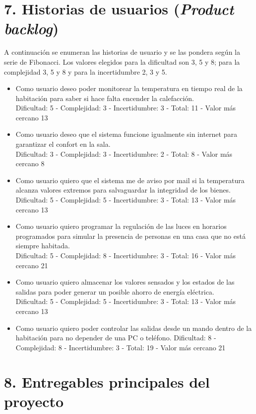 \documentclass[
11pt, %
]{charter}
\begin{document}
\section{7. Historias de usuarios (\textit{Product backlog})}
\label{sec:backlog}

A continuación se enumeran las historias de usuario y se las pondera según la serie de Fibonacci. Los valores elegidos para la dificultad son 3, 5 y 8; para la complejidad 3, 5 y 8 y para la incertidumbre 2, 3 y 5.
\begin{itemize}
	\item Como usuario deseo poder monitorear la temperatura en tiempo real de la habitación para saber si hace falta encender la calefacción. \\
Dificultad: 5 - Complejidad: 3 - Incertidumbre: 3	 - Total: 11 - Valor más cercano 13
	\item Como usuario deseo que el sistema funcione igualmente sin internet para garantizar el confort en la sala. \\
Dificultad: 3 - Complejidad: 3 - Incertidumbre: 2	 - Total: 8 - Valor más cercano 8	
	\item Como usuario quiero que el sistema me de aviso por mail si la temperatura alcanza valores extremos para salvaguardar la integridad de los bienes. \\
Dificultad: 5 - Complejidad: 5 - Incertidumbre: 3	 - Total: 13 - Valor más cercano 13
	\item Como usuario quiero programar la regulación de las luces en horarios programados para simular la presencia de personas en una casa que no está siempre habitada. \\
Dificultad: 5 - Complejidad: 8 - Incertidumbre: 3	 - Total: 16 - Valor más cercano 21
	\item Como usuario quiero almacenar los valores sensados y los estados de las salidas para poder generar un posible ahorro de energía eléctrica. \\
Dificultad: 5 - Complejidad: 5 - Incertidumbre: 3	 - Total: 13 - Valor más cercano 13
	\item Como usuario quiero poder controlar las salidas desde un mando dentro de la habitación para no depender de una PC o teléfono.
Dificultad: 8 - Complejidad: 8 - Incertidumbre: 3	 - Total: 19 - Valor más cercano 21
\end{itemize}

\section{8. Entregables principales del proyecto}
\label{sec:entregables}
\end{document}
